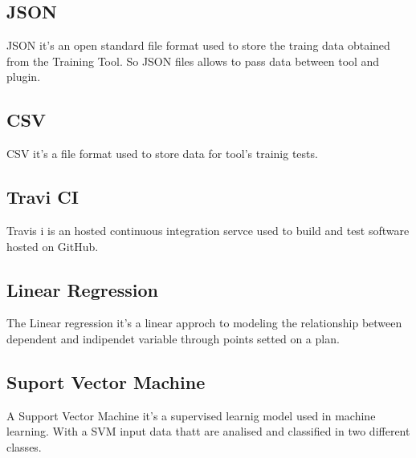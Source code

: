 \subsection{JSON}
JSON it's an open standard file format used to store the traing data obtained from the Training Tool. So JSON files allows to pass data between tool and plugin.

\subsection{CSV}
CSV it's a file format used to store data for tool's trainig tests.

\subsection{Travi CI}
Travis i is an hosted continuous integration servce used to build and test software hosted on GitHub.

\subsection{Linear Regression}
The Linear regression it's a linear approch to modeling the relationship between dependent and indipendet variable through points setted on a plan.

\subsection{Suport Vector Machine}
A Support Vector Machine it's a supervised learnig model used in machine learning. With a SVM input data thatt are analised  and classified in two different classes.
 